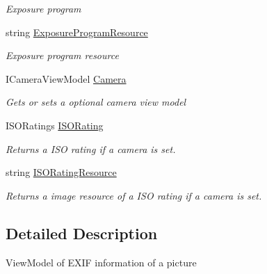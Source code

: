 \begin{DoxyCompactItemize}
\begin{DoxyCompactList}\small\item\em Exposure program \end{DoxyCompactList}\item 
string \mbox{\hyperlink{class_pic_d_b_1_1_view_models_1_1_e_x_i_f_view_model_a0cbab427b153f328b5b161851ddaa153}{Exposure\+Program\+Resource}}
\begin{DoxyCompactList}\small\item\em Exposure program resource \end{DoxyCompactList}\item 
I\+Camera\+View\+Model \mbox{\hyperlink{class_pic_d_b_1_1_view_models_1_1_e_x_i_f_view_model_a38618523a8542f2c481b38e5aba0e157}{Camera}}
\begin{DoxyCompactList}\small\item\em Gets or sets a optional camera view model \end{DoxyCompactList}\item 
I\+S\+O\+Ratings \mbox{\hyperlink{class_pic_d_b_1_1_view_models_1_1_e_x_i_f_view_model_a19f8fa9406ee2292dda168056de7d763}{I\+S\+O\+Rating}}
\begin{DoxyCompactList}\small\item\em Returns a I\+SO rating if a camera is set. \end{DoxyCompactList}\item 
string \mbox{\hyperlink{class_pic_d_b_1_1_view_models_1_1_e_x_i_f_view_model_a21e887ab5a6ab1006313ae4531e2baa7}{I\+S\+O\+Rating\+Resource}}
\begin{DoxyCompactList}\small\item\em Returns a image resource of a I\+SO rating if a camera is set. \end{DoxyCompactList}\end{DoxyCompactItemize}


\subsection{Detailed Description}
View\+Model of E\+X\+IF information of a picture 



